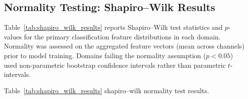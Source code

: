 %

\subsection{Normality Testing: Shapiro--Wilk Results}

Table~\ref{tab:shapiro_wilk_results} reports Shapiro--Wilk test statistics and $p$-values for the primary classification feature distributions in each domain. Normality was assessed on the aggregated feature vectors (mean across channels) prior to model training. Domains failing the normality assumption ($p < 0.05$) used non-parametric bootstrap confidence intervals rather than parametric $t$-intervals.

\iffalse %
\noindent Table~\ref{tab:shapiro_wilk_results} shapiro--wilk normality test results.

